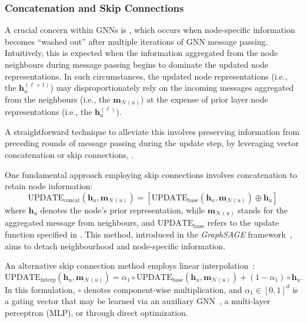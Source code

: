 \subsubsection{Concatenation and Skip Connections} 
A crucial concern within GNNs is , which occurs when node-specific information becomes ``washed out''  after multiple iterations of GNN message passing. Intuitively, this is expected when the information aggregated from the node neighbours during message passing begins to dominate the updated node representations. In such circumstances, the updated node representations (i.e., the $ \mathbf{h}_u^{(\ell+1)} $) may disproportionately rely on the incoming messages aggregated from the neighbours (i.e., the $ \mathbf{m}_{\mathcal{N}(u)} $) at the expense of prior layer node representations (i.e., the $ \mathbf{h}_u^{(\ell)} $).

A straightforward technique to alleviate this involves preserving information from preceding rounds of message passing during the update step, by leveraging vector concatenation or skip connections, .

\medskip

One fundamental approach employing skip connections involves concatenation to retain node information:
\begin{equation*}
\text{UPDATE}_{\text{concat}}(\mathbf{h}_u, \mathbf{m}_{\mathcal{N}(u)}) = [\text{UPDATE}_{\text{base}}(\mathbf{h}_u, \mathbf{m}_{\mathcal{N}(u)}) \oplus \mathbf{h}_u]
\end{equation*}
where $ \mathbf{h}_u $ denotes the node’s prior representation, while $ \mathbf{m}_{\mathcal{N}(u)}$ stands for the aggregated message from neighbours, and $ \text{UPDATE}_{\text{base}} $ refers to the update function specified in . This method, introduced in the \textit{GraphSAGE} framework~\cite{Hamilton2017inductiveRepresentationLearning}, aims to detach neighbourhood and node-specific information.

An alternative skip connection method employs linear interpolation~\cite{Pham2017columnNetworksCollectiveClassification}:
\begin{equation*}
\text{UPDATE}_{\text{interp}}(\mathbf{h}_u, \mathbf{m}_{\mathcal{N}(u)}) = \alpha_1 \circ \text{UPDATE}_{\text{base}}(\mathbf{h}_u, \mathbf{m}_{\mathcal{N}(u)}) + (1 - \alpha_1) \circ \mathbf{h}_u.
\end{equation*}
In this formulation, $ \circ $ denotes component-wise multiplication, and $ \alpha_1 \in [0,1]^d $ is a gating vector that may be learned via an auxiliary GNN~\cite{Pham2017columnNetworksCollectiveClassification}, a multi-layer perceptron (MLP), or through direct optimization.

